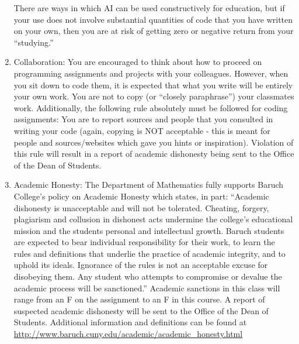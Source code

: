 \documentclass[a4paper]{article}
\begin{document}
\begin{enumerate}
    There are ways in which AI can be used constructively for education, but if your use does not
    involve substantial quantities of code that you have written on your own, then you are at risk of
    getting zero or negative return from your “studying.”
    \item Collaboration: You are encouraged to think about how to proceed on programming assignments
    and projects with your colleagues. However, when you sit down to code them, it is expected that
    what you write will be entirely your own work. You are not to copy (or “closely paraphrase”)
    your classmates work.
    Additionally, the following rule absolutely must be followed for coding assignments:
    You are to report sources and people that you consulted in writing your code (again,
    copying is NOT acceptable - this is meant for people and sources/websites which gave
    you hints or inspiration).
    Violation of this rule will result in a report of academic dishonesty being sent to the Office of the
    Dean of Students.
    \item Academic Honesty: The Department of Mathematics fully supports Baruch College's policy on
    Academic Honesty which states, in part: “Academic dishonesty is unacceptable and will not be
    tolerated. Cheating, forgery, plagiarism and collusion in dishonest acts undermine the college's
    educational mission and the students personal and intellectual growth. Baruch students are
    expected to bear individual responsibility for their work, to learn the rules and definitions that
    underlie the practice of academic integrity, and to uphold its ideals. Ignorance of the rules is not
    an acceptable excuse for disobeying them. Any student who attempts to compromise or devalue
    the academic process will be sanctioned.”
    Academic sanctions in this class will range from an F on the assignment to an F in this course.
    A report of suspected academic dishonesty will be sent to the Office of the Dean of Students.
    Additional information and definitions can be found at
    \url{http://www.baruch.cuny.edu/academic/academic\_honesty.html} 
\end{enumerate}
\end{document}
